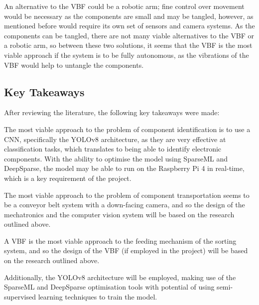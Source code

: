 An alternative to the VBF could be a robotic arm; fine control over movement would be necessary as the components are small and may be tangled, however, as mentioned before would require its own set of sensors and camera systems. As the components can be tangled, there are not many viable alternatives to the VBF or a robotic arm, so between these two solutions, it seems that the VBF is the most viable approach if the system is to be fully autonomous, as the vibrations of the VBF would help to untangle the components.

\subsection{Key Takeaways}
After reviewing the literature, the following key takeaways were made:

The most viable approach to the problem of component identification is to use a CNN, specifically the YOLOv8 architecture, as they are very effective at classification tasks, which translates to being able to identify electronic components. With the ability
to optimise the model using SparseML and DeepSparse, the model may be able to run on the Raspberry Pi 4 in real-time, which is a key requirement of the project.

The most viable approach to the problem of component transportation seems to be a conveyor belt system with a down-facing camera, and so the design of the mechatronics and the computer vision system will be based on the research outlined above.

A VBF is the most viable approach to the feeding mechanism of the sorting system, and so the design of the VBF (if employed in the project) will be based on the research outlined above.

Additionally, the YOLOv8 architecture will be employed, making use of the SparseML and DeepSparse optimisation tools with potential of using semi-supervised learning techniques to train the model.
